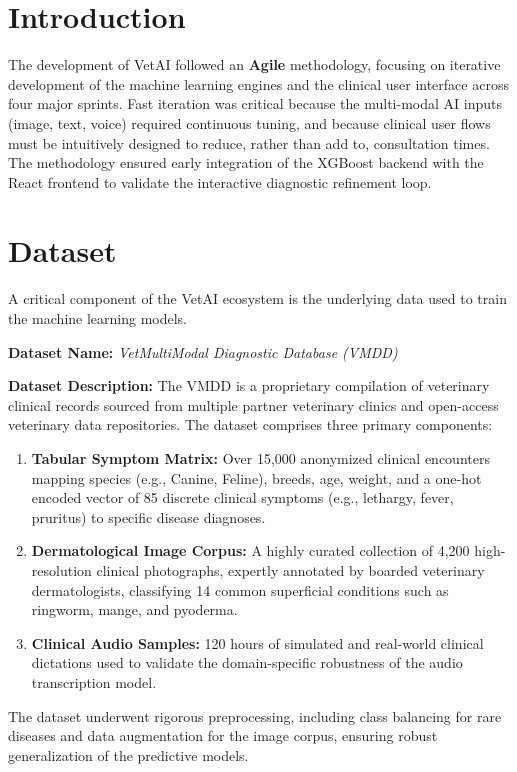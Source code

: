 \documentclass[a4paper,12pt]{report}
\begin{document}
\section{Introduction}

The development of VetAI followed an \textbf{Agile} methodology, focusing on iterative development of the machine learning engines and the clinical user interface across four major sprints. Fast iteration was critical because the multi-modal AI inputs (image, text, voice) required continuous tuning, and because clinical user flows must be intuitively designed to reduce, rather than add to, consultation times. The methodology ensured early integration of the XGBoost backend with the React frontend to validate the interactive diagnostic refinement loop.

\section{Dataset}

A critical component of the VetAI ecosystem is the underlying data used to train the machine learning models. 

\textbf{Dataset Name:} \textit{VetMultiModal Diagnostic Database (VMDD)}

\textbf{Dataset Description:} The VMDD is a proprietary compilation of veterinary clinical records sourced from multiple partner veterinary clinics and open-access veterinary data repositories. The dataset comprises three primary components:
\begin{enumerate}
    \item \textbf{Tabular Symptom Matrix:} Over 15,000 anonymized clinical encounters mapping species (e.g., Canine, Feline), breeds, age, weight, and a one-hot encoded vector of 85 discrete clinical symptoms (e.g., lethargy, fever, pruritus) to specific disease diagnoses.
    \item \textbf{Dermatological Image Corpus:} A highly curated collection of 4,200 high-resolution clinical photographs, expertly annotated by boarded veterinary dermatologists, classifying 14 common superficial conditions such as ringworm, mange, and pyoderma.
    \item \textbf{Clinical Audio Samples:} 120 hours of simulated and real-world clinical dictations used to validate the domain-specific robustness of the audio transcription model.
\end{enumerate}
The dataset underwent rigorous preprocessing, including class balancing for rare diseases and data augmentation for the image corpus, ensuring robust generalization of the predictive models.
\end{document}
